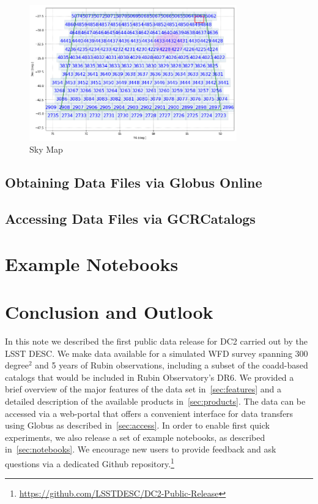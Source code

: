 \documentclass[modern]{descnote}
\begin{document}
\begin{figure}[tbh!]
    \centering
    \includegraphics[width=0.8\textwidth]{figs/skymap.png}
    \caption{Sky Map}
    \label{fig:skymap}
\end{figure}



\subsection{Obtaining Data Files via Globus Online}
\label{sec:download}

\subsection{Accessing Data Files via GCRCatalogs}
\label{sec:gcr}



\section{Example Notebooks}
\label{sec:notebooks}


\section{Conclusion and Outlook}
\label{sec:outlook}

In this note we described the first public data release for DC2 carried out by the LSST DESC. We make data available for a simulated WFD survey spanning 300 degree$^2$ and 5 years of Rubin observations, including a subset of the coadd-based catalogs that would be included in Rubin Observatory's DR6. We provided a brief overview of the major features of the data set in~\autoref{sec:features} and a detailed description of the available products in~\autoref{sec:products}. The data can be accessed via a web-portal that offers a convenient interface for data transfers using Globus as described in~\autoref{sec:access}. In order to enable first quick experiments, we also release a set of example notebooks, as described in~\autoref{sec:notebooks}. We encourage new users to provide feedback and ask questions via a dedicated Github repository.\footnote{\url{https://github.com/LSSTDESC/DC2-Public-Release}}
\end{document}
